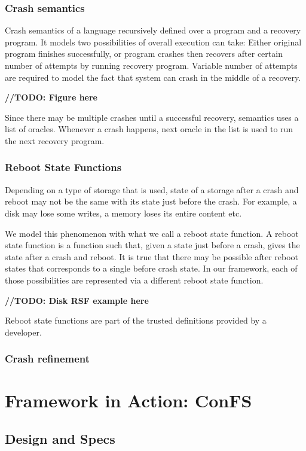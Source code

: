 \documentclass[onecolumn]{paper}
\begin{document}
		\subsubsection{Crash semantics}
		Crash semantics of a language recursively defined over a program and a recovery program. It models two possibilities of overall execution can take:
		Either original program finishes successfully, or program crashes then recovers after certain number of attempts by running recovery program.  
		Variable number of attempts are required to model the fact that system can crash in the middle of a recovery.
		
		{\bf //TODO: Figure here}
		
		Since there may be multiple crashes until a successful recovery, semantics uses a list of oracles. Whenever a crash happens, next oracle in the list is used to run the next recovery program.
		
		\subsubsection{Reboot State Functions}
		Depending on a type of storage that is used, state of a storage after a crash and reboot may not be the same with its state just before the crash.
		For example, a disk may lose some writes, a memory loses its entire content etc.
		
		We model this phenomenon with what we call a reboot state function. A reboot state function is a function such that, given a state just before a crash, gives the state after a crash and reboot. It is true that there may be possible after reboot states that corresponds to a single before crash state. In our framework, each of those possibilities are represented via a different reboot state function.
		
		{\bf //TODO: Disk RSF example here}
		
		Reboot state functions are part of the trusted definitions provided by a developer.
		
		\subsubsection{Crash refinement}
\newpage
\section{Framework in Action: ConFS}
	\subsection{Design and Specs}
\end{document}
